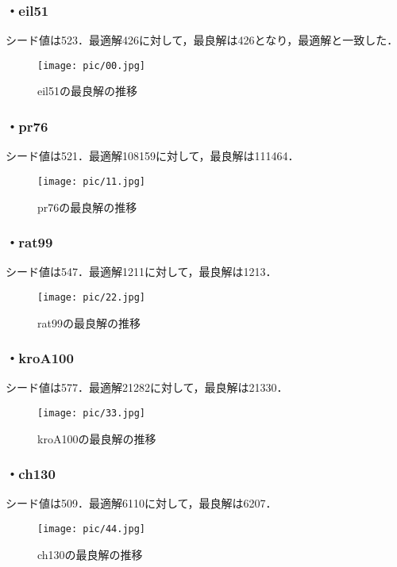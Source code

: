 \documentclass[a4j]{jarticle}
\begin{document}
\subsubsection*{・eil51}
シード値は523．最適解426に対して，最良解は426となり，最適解と一致した．
\begin{figure}[H]
 \begin{center}
  \texttt{[image: pic/00.jpg]}
  \caption{eil51の最良解の推移}
  \label{00}
 \end{center}
\end{figure}
\clearpage
\subsubsection*{・pr76}
シード値は521．最適解108159に対して，最良解は111464．
\begin{figure}[H]
 \begin{center}
  \texttt{[image: pic/11.jpg]}
  \caption{pr76の最良解の推移}
  \label{11}
 \end{center}
\end{figure}
\subsubsection*{・rat99}
シード値は547．最適解1211に対して，最良解は1213．
\begin{figure}[H]
 \begin{center}
  \texttt{[image: pic/22.jpg]}
  \caption{rat99の最良解の推移}
  \label{22}
 \end{center}
\end{figure}
\clearpage
\subsubsection*{・kroA100}
シード値は577．最適解21282に対して，最良解は21330．
\begin{figure}[H]
 \begin{center}
  \texttt{[image: pic/33.jpg]}
  \caption{kroA100の最良解の推移}
  \label{33}
 \end{center}
\end{figure}
\subsubsection*{・ch130}
シード値は509．最適解6110に対して，最良解は6207．
\begin{figure}[H]
 \begin{center}
  \texttt{[image: pic/44.jpg]}
  \caption{ch130の最良解の推移}
  \label{44}
 \end{center}
\end{figure}
\end{document}
